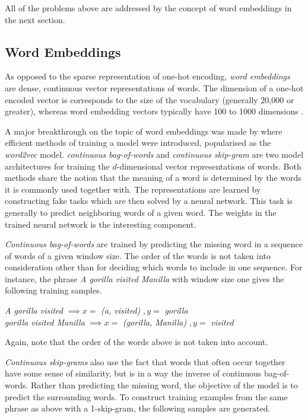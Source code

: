 All of the problems above are addressed by the concept of word embeddings in the next section. 

\subsection{Word Embeddings}
As opposed to the sparse representation of one-hot encoding, \textit{word embeddings} are dense, continuous vector representations of words. The dimension of a one-hot encoded vector is corresponds to the size of the vocabulary (generally 20,000 or greater), whereas word embedding vectors typically have 100 to 1000 dimensions \citep{chollet2017deep}.

A major breakthrough on the topic of word embeddings was made by \citet{mikolov2013efficient} where efficient methods of training a model were introduced, popularised as the \textit{word2vec} model. \textit{continuous bag-of-words} and \textit{continuous skip-gram} are two model architectures for training the $d$-dimensional vector representations of words. Both methods share the notion that the meaning of a word is determined by the words it is commonly used together with. The representations are learned by constructing fake tasks which are then solved by a neural network. This task is generally to predict neighboring words of a given word. The weights in the trained neural network is the interesting component.

\textit{Continuous bag-of-words} are trained by predicting the missing word in a sequence of words of a given window size. The order of the words is not taken into consideration other than for deciding which words to include in one sequence. For instance, the phrase \textit{A gorilla visited Manilla} with window size one gives the following training samples.
\begin{center}
\textit{A gorilla visited} $\implies x = $ \textit{(a, visited)} $,y = $ \textit{gorilla} \\ \vspace{1em}
\textit{gorilla visited Manilla} $\implies x = $ \textit{(gorilla, Manilla)} $,y = $ \textit{visited} \\
\end{center}

Again, note that the order of the words above is not taken into account.

\textit{Continuous skip-grams} also use the fact that words that often occur together have some sense of similarity, but is in a way the inverse of continuous bag-of-words. Rather than predicting the missing word, the objective of the model is to predict the surrounding words. To construct training examples from the same phrase as above with a 1-skip-gram, the following samples are generated. 

